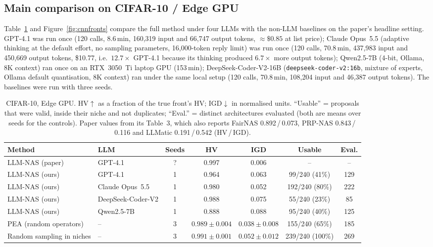 \documentclass[11pt,a4paper]{article}
\newcommand{\code}[1]{\texttt{#1}}
\begin{document}
\subsection{Main comparison on CIFAR-10 / Edge GPU}
Table~\ref{tab:cnn} and Figure~\ref{fig:cnnfronts} compare the full method under four LLMs with the non-LLM baselines on the paper's headline setting. GPT-4.1 was run once (120 calls, 8.6\,min, 160{,}319 input and 66{,}747 output tokens, $\approx\$0.85$ at list price); Claude Opus~5.5 (adaptive thinking at the default effort, no sampling parameters, 16{,}000-token reply limit) was run once (120 calls, 70.8\,min, 437{,}983 input and 450{,}669 output tokens, \$10.77, i.e.\ $12.7\times$ GPT-4.1 because its thinking produced $6.7\times$ more output tokens); Qwen2.5-7B (4-bit, Ollama, 8K context) ran once on an RTX~3050~Ti laptop GPU (153\,min); DeepSeek-Coder-V2-16B (\code{deepseek-coder-v2:16b}, mixture of experts, Ollama default quantisation, 8K context) ran under the same local setup (120 calls, 70.8\,min, 108{,}204 input and 46{,}387 output tokens). The baselines were run with three seeds.

\begin{table}[h]\centering\footnotesize
\caption{CIFAR-10, Edge GPU. HV$\uparrow$ as a fraction of the true front's HV; IGD$\downarrow$ in normalised units. ``Usable'' = proposals that were valid, inside their niche and not duplicates; ``Eval.'' = distinct architectures evaluated (both are means over seeds for the controls). Paper values from its Table~3, which also reports FairNAS 0.892\,/\,0.073, PRP-NAS 0.843\,/\,0.116 and LLMatic 0.191\,/\,0.542 (HV\,/\,IGD).}\label{tab:cnn}
\setlength{\tabcolsep}{4pt}
\begin{tabular}{llccccc}
\toprule
Method & LLM & Seeds & HV & IGD & Usable & Eval. \\
\midrule
LLM-NAS (paper) & GPT-4.1 & ? & 0.997 & 0.006 & -- & -- \\
LLM-NAS (ours) & GPT-4.1 & 1 & 0.964 & 0.063 & 99/240 (41\%) & 129 \\
LLM-NAS (ours) & Claude Opus~5.5 & 1 & 0.980 & 0.052 & 192/240 (80\%) & 222 \\
LLM-NAS (ours) & DeepSeek-Coder-V2 & 1 & 0.988 & 0.075 & 55/240 (23\%) & 85 \\
LLM-NAS (ours) & Qwen2.5-7B & 1 & 0.888 & 0.088 & 95/240 (40\%) & 125 \\
PEA (random operators) & -- & 3 & $0.989\pm0.004$ & $0.038\pm0.008$ & 155/240 (65\%) & 185 \\
Random sampling in niches & -- & 3 & $0.991\pm0.001$ & $0.052\pm0.012$ & 239/240 (100\%) & 269 \\
\bottomrule
\end{tabular}
\end{table}
\end{document}

